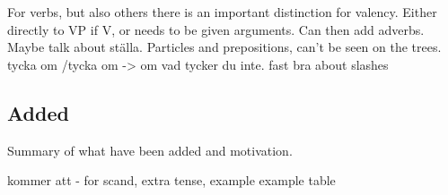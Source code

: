 \documentclass{report}
\begin{document}
For verbs, but also others there is an important distinction for valency.
Either directly to VP if V, or needs to be given arguments. Can then add adverbs.
Maybe talk about ställa.
Particles and prepositions, can't be seen on the trees.
tycka om /tycka om -> om vad tycker du inte. fast bra
about slashes\cite{gazdar}



\subsection{Added}
\label{sec:Added}
Summary of what have been added and motivation.

kommer att - for scand, extra tense, example
example table

\end{document}
